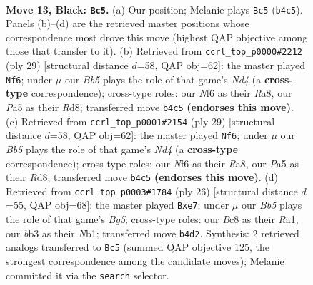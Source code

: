 \documentclass[11pt]{article}
\begin{document}
\clearpage

\begin{figure}[p]\centering
\begin{subfigure}{0.46\textwidth}\centering
\resizebox{\linewidth}{!}{%
\newchessgame
\chessboard[
  setfen={rnb1r3/1pk2ppp/4pn2/p7/Pb1N3P/1B2P3/1P1B1PP1/RN3RK1 b - - 4 13},
  showmover=false,
  pgfstyle=straightmove, color=movearrow, markmove={b4-c5}
]}
\caption{}
\end{subfigure}\hfill
\begin{subfigure}{0.46\textwidth}\centering
\resizebox{\linewidth}{!}{%
\newchessgame
\chessboard[
  setfen={r2r1nk1/1p1b1ppp/p3p3/P1bn4/8/2PBNN2/1P3PPP/R1BR2K1 b - - 8 15},
  showmover=false,
  pgfstyle=straightmove, color=movearrow, markmove={d5-f6}
]}
\caption{}
\end{subfigure}
\\[4pt]
\begin{subfigure}{0.46\textwidth}\centering
\resizebox{\linewidth}{!}{%
\newchessgame
\chessboard[
  setfen={r2r1nk1/1p1b1ppp/p3p3/P1bn4/8/2PBNN2/1P3PPP/R1BR2K1 b - - 8 15},
  showmover=false,
  pgfstyle=straightmove, color=movearrow, markmove={d5-f6}
]}
\caption{}
\end{subfigure}\hfill
\begin{subfigure}{0.46\textwidth}\centering
\resizebox{\linewidth}{!}{%
\newchessgame
\chessboard[
  setfen={r1b1k1nr/ppp1b2p/3pn3/5pB1/3P3P/2P5/PP3NP1/RN2KB1R w KQkq - 2 14},
  showmover=false,
  pgfstyle=straightmove, color=movearrow, markmove={g5-e7}
]}
\caption{}
\end{subfigure}
\caption{\textbf{Move 13, Black: \texttt{Bc5}.} (a) Our position; Melanie plays \texttt{Bc5} (\texttt{b4c5}). Panels (b)--(d) are the retrieved master positions whose correspondence most drove this move (highest QAP objective among those that transfer to it). (b) Retrieved from \texttt{ccrl\_top\_p0000\#2212} (ply 29) [structural distance $d$=58, QAP obj=62]: the master played \texttt{Nf6}; under $\mu$ our \emph{Bb5} plays the role of that game's \emph{Nd4} (a \textbf{cross-type} correspondence); cross-type roles: our \emph{N}f6 as their \emph{R}a8, our \emph{P}a5 as their \emph{R}d8; transferred move \texttt{b4c5} \textbf{(endorses this move)}. (c) Retrieved from \texttt{ccrl\_top\_p0001\#2154} (ply 29) [structural distance $d$=58, QAP obj=62]: the master played \texttt{Nf6}; under $\mu$ our \emph{Bb5} plays the role of that game's \emph{Nd4} (a \textbf{cross-type} correspondence); cross-type roles: our \emph{N}f6 as their \emph{R}a8, our \emph{P}a5 as their \emph{R}d8; transferred move \texttt{b4c5} \textbf{(endorses this move)}. (d) Retrieved from \texttt{ccrl\_top\_p0003\#1784} (ply 26) [structural distance $d$=55, QAP obj=68]: the master played \texttt{Bxe7}; under $\mu$ our \emph{Bb5} plays the role of that game's \emph{Bg5}; cross-type roles: our \emph{B}c8 as their \emph{R}a1, our \emph{b}b3 as their \emph{N}b1; transferred move \texttt{b4d2}. Synthesis: 2 retrieved analogs transferred to \texttt{Bc5} (summed QAP objective 125, the strongest correspondence among the candidate moves); Melanie committed it via the \texttt{search} selector.}
\label{fig:thought-m25}
\end{figure}
\end{document}

